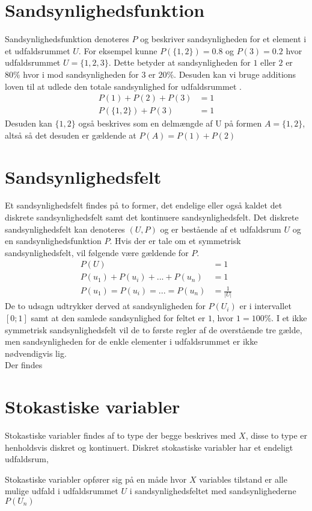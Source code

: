 \documentclass[../../SRP.tex]{subfiles}
\begin{document}
\section{Sandsynlighedsfunktion}

Sandsynlighedsfunktion denoteres $P$ og beskriver sandsynligheden for et element i et udfaldsrummet $U$. For eksempel kunne $P(\{1,2\}) = 0.8$ og $P(3) = 0.2$ hvor udfaldsrummet $U = \{1,2,3\}$. Dette betyder at sandsynligheden for $1$ eller $2$ er $80\%$ hvor i mod sandsynligheden for $3$ er $20\%$. Desuden kan vi bruge additions loven til at udlede den totale sandsynlighed for udfaldsrummet \cite{SC}.
\begin{align}
  P(1) + P(2) + P(3) &= 1 \\
  P(\{1,2\}) + P(3) &= 1
\end{align}
Desuden kan $\{1,2\}$ også beskrives som en delmængde af U på formen $A = \{1,2\}$, altså så det desuden er gældende at $P(A) = P(1) + P(2)$

\section{Sandsynlighedsfelt}

Et sandsynlighedsfelt findes på to former, det endelige eller også kaldet det diskrete sandsynlighedsfelt samt det kontinuere sandsynlighedsfelt. Det diskrete sandsynlighedsfelt kan denoteres $(U, P)$ og er bestående af et udfaldsrum $U$ og en sandsynlighedsfunktion $P$. Hvis der er tale om et symmetrisk sandsynlighedsfelt, vil følgende være gældende for $P$.
\begin{align}
  P(U) &= 1 \\
  P(u_1) + P(u_i) + ... + P(u_n) &= 1 \\
  P(u_1) = P(u_i) = ... = P(u_n) &= \frac{1}{|U|}
\end{align}
De to udsagn udtrykker derved at sandsynligheden for $P(U_i)$ er i intervallet $[0;1]$ samt at den samlede sandsynlighed for feltet er $1$, hvor $1 = 100\%$. I et ikke symmetrisk sandsynlighedsfelt vil de to første regler af de overstående tre gælde, men sandsynligheden for de enkle elementer i udfaldsrummet er ikke nødvendigvis lig. \\

Der findes 

\section{Stokastiske variabler}

Stokastiske variabler findes af to type der begge beskrives med $X$, disse to type er henholdsvis diskret og kontinuert. Diskret stokastiske variabler har et endeligt udfaldsrum,

Stokastiske variabler opfører sig på en måde hvor $X$ variables tilstand er alle mulige udfald i udfaldsrummet $U$ i sandsynlighedsfeltet med sandsynlighederne $P(U_n)$
\end{document}
